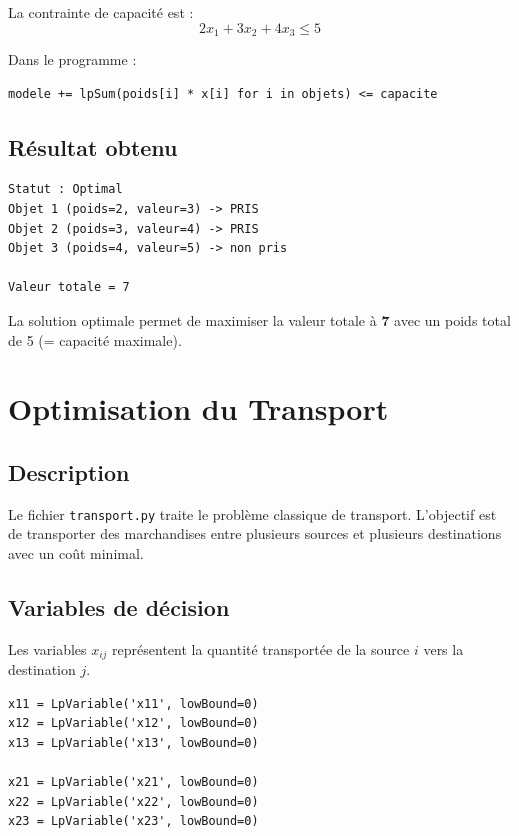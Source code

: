 \documentclass[12pt,a4paper]{article}
\begin{document}
La contrainte de capacité est :
\[
2x_1 + 3x_2 + 4x_3 \leq 5
\]

Dans le programme :
\begin{lstlisting}
modele += lpSum(poids[i] * x[i] for i in objets) <= capacite
\end{lstlisting}

\subsection{Résultat obtenu}

\begin{lstlisting}
Statut : Optimal
Objet 1 (poids=2, valeur=3) -> PRIS
Objet 2 (poids=3, valeur=4) -> PRIS
Objet 3 (poids=4, valeur=5) -> non pris

Valeur totale = 7
\end{lstlisting}

La solution optimale permet de maximiser la valeur totale à
\textbf{7} avec un poids total de 5 (= capacité maximale).

\section{Optimisation du Transport}

\subsection{Description}
Le fichier \texttt{transport.py} traite le problème classique
de transport. L'objectif est de transporter des marchandises
entre plusieurs sources et plusieurs destinations avec un coût
minimal.

\subsection{Variables de décision}

Les variables $x_{ij}$ représentent la quantité transportée
de la source $i$ vers la destination $j$.

\begin{lstlisting}
x11 = LpVariable('x11', lowBound=0)
x12 = LpVariable('x12', lowBound=0)
x13 = LpVariable('x13', lowBound=0)

x21 = LpVariable('x21', lowBound=0)
x22 = LpVariable('x22', lowBound=0)
x23 = LpVariable('x23', lowBound=0)
\end{lstlisting}
\end{document}
